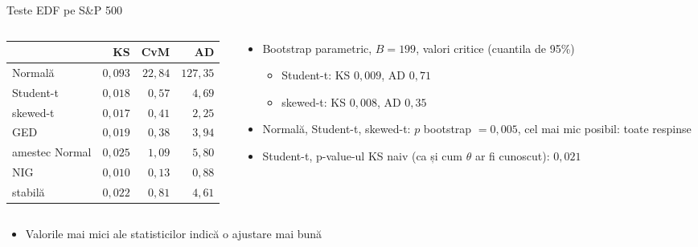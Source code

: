 \begin{frame}{Teste EDF pe S\&P 500}
\itemsize{\footnotesize}
\begin{columns}[T]
\begin{column}{0.44\textwidth}
\begin{center}
\scriptsize
\begin{tabular}{lrrr}
\toprule
& KS & CvM & AD \\
\midrule
Normală & $0{,}093$ & $22{,}84$ & $127{,}35$ \\
Student-t & $0{,}018$ & $0{,}57$ & $4{,}69$ \\
skewed-t & $0{,}017$ & $0{,}41$ & $2{,}25$ \\
GED & $0{,}019$ & $0{,}38$ & $3{,}94$ \\
amestec Normal & $0{,}025$ & $1{,}09$ & $5{,}80$ \\
NIG & $0{,}010$ & $0{,}13$ & $0{,}88$ \\
stabilă & $0{,}022$ & $0{,}81$ & $4{,}61$ \\
\bottomrule
\end{tabular}
\end{center}

\end{column}
\begin{column}{0.52\textwidth}
\begin{itemize}
    \item Bootstrap parametric, $B = 199$, valori critice (cuantila de 95\%)
    \begin{itemize}
        \item Student-t: KS $0{,}009$, AD $0{,}71$
        \item skewed-t: KS $0{,}008$, AD $0{,}35$
    \end{itemize}
    \item Normală, Student-t, skewed-t: $p$ bootstrap $= 0{,}005$, cel mai mic posibil: toate respinse
    \item Student-t, p-value-ul KS naiv (ca și cum $\theta$ ar fi cunoscut): $0{,}021$
\end{itemize}
\end{column}
\end{columns}\begin{itemize}
    \item Valorile mai mici ale statisticilor indică o ajustare mai bună
\end{itemize}
\end{frame}

